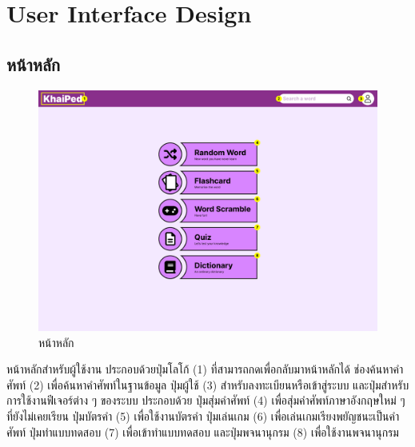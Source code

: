 \documentclass[12pt,oneside,openright,a4paper]{cpe-thai-project}
\begin{document}
\pagebreak
\section{User Interface Design}
\subsection{หน้าหลัก}
\begin{figure}[!h]\centering
	\includegraphics[width=\textwidth, keepaspectratio=true]{image/chap3/ui/Home page.png}
	\caption{หน้าหลัก}\label{fig:UI_Home}
\end{figure}
\hspace{1cm}
หน้าหลักสำหรับผู้ใช้งาน ประกอบด้วยปุ่มโลโก้ (1) ที่สามารถกดเพื่อกลับมาหน้าหลักได้ ช่องค้นหาคำศัพท์ (2) เพื่อค้นหาคำศัพท์ในฐานข้อมูล
ปุ่มผู้ใช้ (3) สำหรับลงทะเบียนหรือเข้าสู่ระบบ และปุ่มสำหรับการใช้งานฟีเจอร์ต่าง ๆ ของระบบ ประกอบด้วย
ปุ่มสุ่มคำศัพท์ (4) เพื่อสุ่มคำศัพท์ภาษาอังกฤษใหม่ ๆ ที่ยังไม่เคยเรียน ปุ่มบัตรคำ (5) เพื่อใช้งานบัตรคำ ปุ่มเล่นเกม (6) เพื่อเล่นเกมเรียงพยัญชนะเป็นคำศัพท์
ปุ่มทำแบบทดสอบ (7) เพื่อเข้าทำแบบทดสอบ และปุ่มพจนานุกรม (8) เพื่อใช้งานพจนานุกรม

\pagebreak
\end{document}
